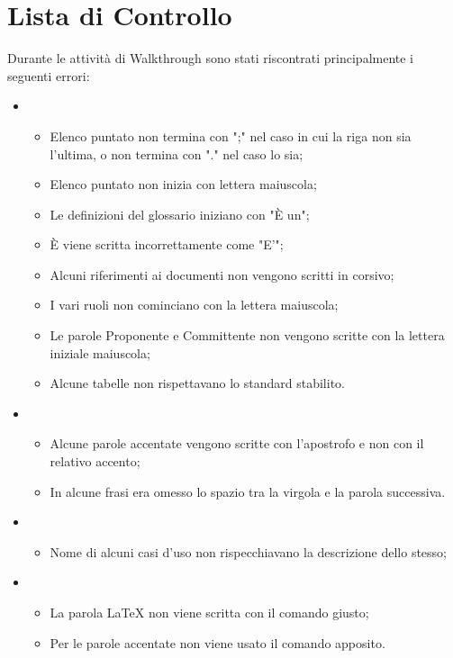 \section{Lista di Controllo}
\label{}
Durante le attività di Walkthrough sono stati riscontrati principalmente i seguenti errori:\\
\begin{itemize}
\item {}
	\begin{itemize}
		\item Elenco puntato non termina con ";" nel caso in cui la riga non sia l'ultima, o non termina con "." nel caso lo sia;
		\item Elenco puntato non inizia con lettera maiuscola;
		\item Le definizioni del glossario iniziano con "È un";
		\item È viene scritta incorrettamente come "E'";
		\item Alcuni riferimenti ai documenti non vengono scritti in corsivo;
		\item I vari ruoli non cominciano con la lettera maiuscola;
		\item Le parole Proponente e Committente non vengono scritte con la lettera iniziale maiuscola;
		\item Alcune tabelle non rispettavano lo standard stabilito.\\
	\end{itemize}
\item {}
	\begin{itemize}
		\item Alcune parole accentate vengono scritte con l'apostrofo e non con il relativo accento;
		\item In alcune frasi era omesso lo spazio tra la virgola e la parola successiva.
	\end{itemize}
\item {}
	\begin{itemize}
		\item Nome di alcuni casi d'uso non rispecchiavano la descrizione dello stesso;
	\end{itemize}
\item \grassetto{\LaTeX{}}
	\begin{itemize}
		\item La parola \LaTeX{} non viene scritta con il comando giusto;
		\item Per le parole accentate non viene usato il comando apposito.
	\end{itemize}
\end{itemize}



